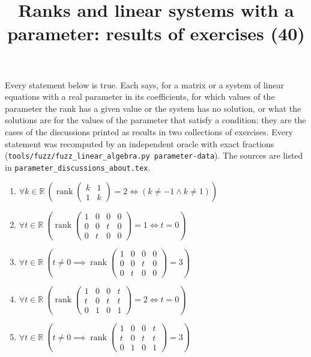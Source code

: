 \documentclass[11pt,a4paper]{article}
\title{Ranks and linear systems with a parameter: results of exercises (40)}
\author{}
\date{}
\begin{document}
\maketitle
Every statement below is true. Each says, for a matrix or a system of linear equations with a real parameter in its coefficients, for which values of the parameter the rank has a given value or the system has no solution, or what the solutions are for the values of the parameter that satisfy a condition: they are the cases of the discussions printed as results in two collections of exercises. Every statement was recomputed by an independent oracle with exact fractions (\texttt{tools/fuzz/fuzz\_linear\_algebra.py parameter-data}). The sources are listed in \texttt{parameter\_discussions\_about.tex}.

\begin{enumerate}
\item $\displaystyle \forall k \in \mathbb{R}\ \left( \operatorname{rank} \begin{pmatrix} k & 1 \\ 1 & k \end{pmatrix} = 2 \iff \left( k \neq -1 \land k \neq 1 \right) \right)$
\item $\displaystyle \forall t \in \mathbb{R}\ \left( \operatorname{rank} \begin{pmatrix} 1 & 0 & 0 & 0 \\ 0 & 0 & t & 0 \\ 0 & t & 0 & 0 \end{pmatrix} = 1 \iff t = 0 \right)$
\item $\displaystyle \forall t \in \mathbb{R}\ \left( t \neq 0 \implies \operatorname{rank} \begin{pmatrix} 1 & 0 & 0 & 0 \\ 0 & 0 & t & 0 \\ 0 & t & 0 & 0 \end{pmatrix} = 3 \right)$
\item $\displaystyle \forall t \in \mathbb{R}\ \left( \operatorname{rank} \begin{pmatrix} 1 & 0 & 0 & t \\ t & 0 & t & t \\ 0 & 1 & 0 & 1 \end{pmatrix} = 2 \iff t = 0 \right)$
\item $\displaystyle \forall t \in \mathbb{R}\ \left( t \neq 0 \implies \operatorname{rank} \begin{pmatrix} 1 & 0 & 0 & t \\ t & 0 & t & t \\ 0 & 1 & 0 & 1 \end{pmatrix} = 3 \right)$

\end{enumerate}
\end{document}
